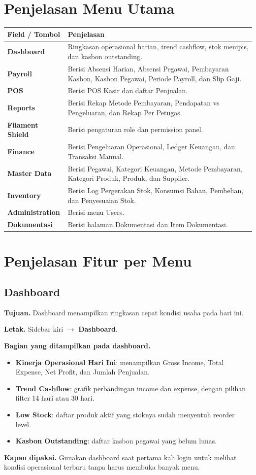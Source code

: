 \documentclass[12pt,a4paper]{article}
\providecommand{\textrightarrow}{\ensuremath{\rightarrow}}
\newcommand{\FieldTableStart}{
\begin{longtable}{L{0.30\textwidth}L{0.64\textwidth}}
\toprule
\textbf{Field / Tombol} & \textbf{Penjelasan} \\
\midrule
\endhead
}
\newcommand{\FieldTableEnd}{
\bottomrule
\end{longtable}
}
\newcommand{\FieldRow}[2]{
\textbf{#1} & #2 \\
}
\begin{document}
\section{Penjelasan Menu Utama}
\FieldTableStart
\FieldRow{Dashboard}{Ringkasan operasional harian, trend cashflow, stok menipis, dan kasbon outstanding.}
\FieldRow{Payroll}{Berisi Absensi Harian, Absensi Pegawai, Pembayaran Kasbon, Kasbon Pegawai, Periode Payroll, dan Slip Gaji.}
\FieldRow{POS}{Berisi POS Kasir dan daftar Penjualan.}
\FieldRow{Reports}{Berisi Rekap Metode Pembayaran, Pendapatan vs Pengeluaran, dan Rekap Per Petugas.}
\FieldRow{Filament Shield}{Berisi pengaturan role dan permission panel.}
\FieldRow{Finance}{Berisi Pengeluaran Operasional, Ledger Keuangan, dan Transaksi Manual.}
\FieldRow{Master Data}{Berisi Pegawai, Kategori Keuangan, Metode Pembayaran, Kategori Produk, Produk, dan Supplier.}
\FieldRow{Inventory}{Berisi Log Pergerakan Stok, Konsumsi Bahan, Pembelian, dan Penyesuaian Stok.}
\FieldRow{Administration}{Berisi menu Users.}
\FieldRow{Dokumentasi}{Berisi halaman Dokumentasi dan Item Dokumentasi.}
\FieldTableEnd

\section{Penjelasan Fitur per Menu}

\subsection{Dashboard}
\textbf{Tujuan.} Dashboard menampilkan ringkasan cepat kondisi usaha pada hari ini.

\textbf{Letak.} Sidebar kiri \textrightarrow{} \textbf{Dashboard}.

\textbf{Bagian yang ditampilkan pada dashboard.}
\begin{itemize}
    \item \textbf{Kinerja Operasional Hari Ini}: menampilkan Gross Income, Total Expense, Net Profit, dan Jumlah Penjualan.
    \item \textbf{Trend Cashflow}: grafik perbandingan income dan expense, dengan pilihan filter 14 hari atau 30 hari.
    \item \textbf{Low Stock}: daftar produk aktif yang stoknya sudah menyentuh reorder level.
    \item \textbf{Kasbon Outstanding}: daftar kasbon pegawai yang belum lunas.
\end{itemize}

\textbf{Kapan dipakai.} Gunakan dashboard saat pertama kali login untuk melihat kondisi operasional terbaru tanpa harus membuka banyak menu.
\end{document}
